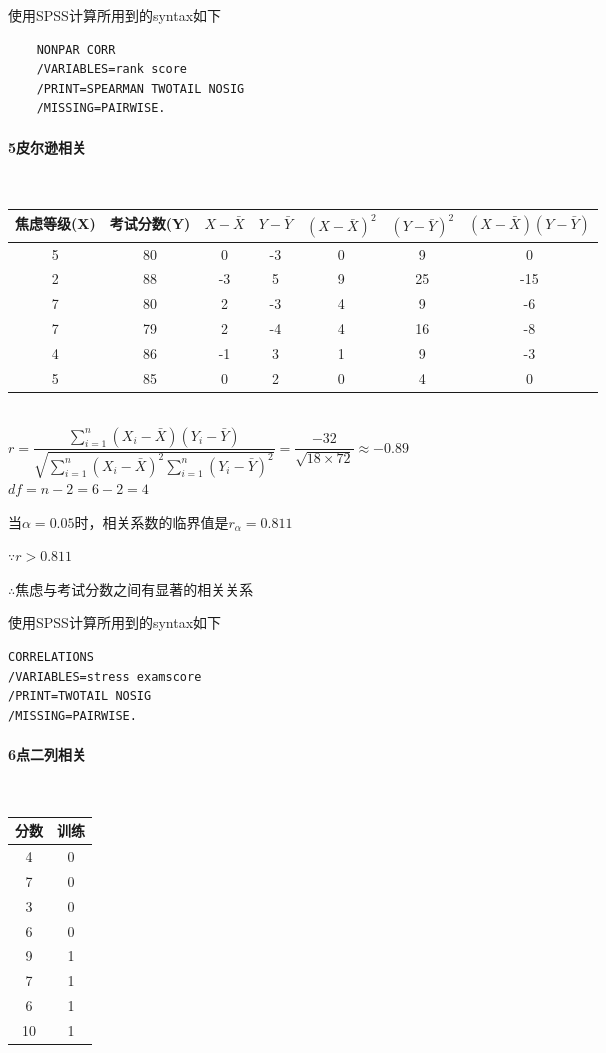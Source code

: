 \documentclass[UTF8]{ctexart}
\begin{document}
\noindent
使用SPSS计算所用到的syntax如下
\begin{verbatim}
	NONPAR CORR 
	/VARIABLES=rank score 
	/PRINT=SPEARMAN TWOTAIL NOSIG 
	/MISSING=PAIRWISE.
\end{verbatim}

\newpage
\paragraph{5皮尔逊相关}
~\\

\begin{tabular}{ccccccc}
\toprule
焦虑等级(X) & 考试分数(Y) & $X-\bar{X}$ & $Y-\bar{Y}$ & $(X-\bar{X})^2$ & $(Y-\bar{Y})^2$ & $(X-\bar{X})(Y-\bar{Y})$ \\
\midrule
5 & 80 & 0 & -3 & 0 & 9 & 0 \\
2 & 88 & -3 & 5 & 9 & 25 & -15 \\
7 & 80 & 2 & -3 & 4 & 9 & -6 \\
7 & 79 & 2 & -4 & 4 & 16 & -8 \\
4 & 86 & -1 & 3 & 1 & 9 & -3 \\
5 & 85 & 0 & 2 & 0 & 4 & 0 \\

\bottomrule
\end{tabular}
~\\

$r=\dfrac{\displaystyle \sum_{i=1}^{n}(X_i-\bar{X})(Y_i-\bar{Y})}{\sqrt{\displaystyle \sum_{i=1}^{n}(X_i-\bar{X})^2\sum_{i=1}^{n}(Y_i-\bar{Y})^2}}=\dfrac{-32}{\sqrt{18\times 72}}\approx-0.89$
~\\

$df=n-2=6-2=4$

当$\alpha=0.05$时，相关系数的临界值是$r_\alpha=0.811$

$\because r>0.811$

$\therefore$焦虑与考试分数之间有显著的相关关系

\noindent
使用SPSS计算所用到的syntax如下
\begin{verbatim}
CORRELATIONS 
/VARIABLES=stress examscore 
/PRINT=TWOTAIL NOSIG 
/MISSING=PAIRWISE.
\end{verbatim}


\paragraph{6点二列相关}
~\\

\begin{tabular}{cc}
\toprule
分数 & 训练 \\
\midrule
4 & 0 \\
7 & 0 \\
3 & 0 \\
6 & 0 \\
9 & 1 \\
7 & 1 \\
6 & 1 \\
10 & 1 \\

\bottomrule
\end{tabular}
\end{document}

